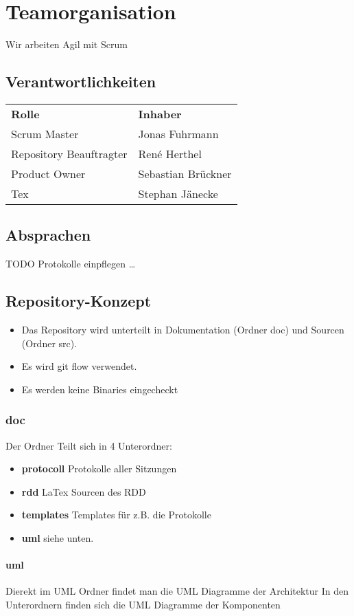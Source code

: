 \chapter{Teamorganisation}

Wir arbeiten Agil mit Scrum

\section{Verantwortlichkeiten}

\begin{tabular}{ll}
  \textbf{Rolle} & \textbf{Inhaber}\\
   Scrum Master & Jonas Fuhrmann\\
   Repository Beauftragter & René Herthel\\
   Product Owner & Sebastian Brückner\\
   Tex & Stephan Jänecke
 \end{tabular}

\section{Absprachen}

TODO Protokolle einpflegen \ldots

\section{Repository-Konzept}

\begin{itemize}
	\item Das Repository wird unterteilt in Dokumentation (Ordner doc) und Sourcen (Ordner src).
	\item Es wird git flow verwendet.
	\item Es werden keine Binaries eingecheckt
\end{itemize}

\subsection{doc}
Der Ordner Teilt sich in 4 Unterordner:
\begin{itemize}
	\item \textbf{protocoll} Protokolle aller Sitzungen
	\item \textbf{rdd}  LaTex Sourcen des RDD
	\item \textbf{templates} Templates für z.B. die Protokolle
	\item \textbf{uml} siehe unten.
\end{itemize}

\subsubsection{uml}
Dierekt im UML Ordner findet man die UML Diagramme der Architektur
In den Unterordnern finden sich die UML Diagramme der Komponenten

	